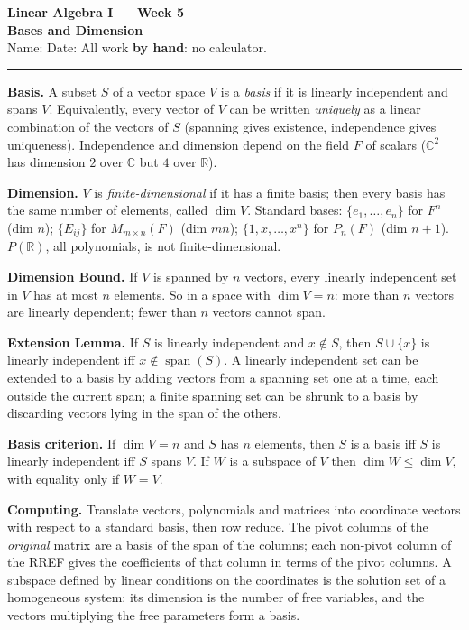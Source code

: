 \documentclass[11pt]{article}
\begin{document}
{\Large\bfseries\color{ink} Linear Algebra I --- Week 5}\\[2pt]
{\large\bfseries\color{ink} Bases and Dimension}\\[3pt]
{\small Name: \underline{\hspace{5cm}}\hfill Date: \underline{\hspace{3cm}}\qquad All work \textbf{by hand}: no calculator.}
\vspace{4pt}\hrule\vspace{8pt}

\begin{tcolorbox}[colback=soft,colframe=ink,title={\bfseries Key Facts}]
\textbf{Basis.} A subset $S$ of a vector space $V$ is a \emph{basis} if it is linearly independent and spans $V$. Equivalently, every vector of $V$ can be written \emph{uniquely} as a linear combination of the vectors of $S$ (spanning gives existence, independence gives uniqueness). Independence and dimension depend on the field $F$ of scalars ($\mathbb{C}^{2}$ has dimension $2$ over $\mathbb{C}$ but $4$ over $\mathbb{R}$).

\textbf{Dimension.} $V$ is \emph{finite-dimensional} if it has a finite basis; then every basis has the same number of elements, called $\dim V$. Standard bases: $\{e_1,\dots,e_n\}$ for $F^{n}$ (dim $n$); $\{E_{ij}\}$ for $M_{m\times n}(F)$ (dim $mn$); $\{1,x,\dots,x^{n}\}$ for $P_n(F)$ (dim $n+1$). $P(\mathbb{R})$, all polynomials, is not finite-dimensional.

\textbf{Dimension Bound.} If $V$ is spanned by $n$ vectors, every linearly independent set in $V$ has at most $n$ elements. So in a space with $\dim V=n$: more than $n$ vectors are linearly dependent; fewer than $n$ vectors cannot span.

\textbf{Extension Lemma.} If $S$ is linearly independent and $x\notin S$, then $S\cup\{x\}$ is linearly independent iff $x\notin\operatorname{span}(S)$. A linearly independent set can be extended to a basis by adding vectors from a spanning set one at a time, each outside the current span; a finite spanning set can be shrunk to a basis by discarding vectors lying in the span of the others.

\textbf{Basis criterion.} If $\dim V=n$ and $S$ has $n$ elements, then $S$ is a basis iff $S$ is linearly independent iff $S$ spans $V$. If $W$ is a subspace of $V$ then $\dim W\le\dim V$, with equality only if $W=V$.

\textbf{Computing.} Translate vectors, polynomials and matrices into coordinate vectors with respect to a standard basis, then row reduce. The pivot columns of the \emph{original} matrix are a basis of the span of the columns; each non-pivot column of the RREF gives the coefficients of that column in terms of the pivot columns. A subspace defined by linear conditions on the coordinates is the solution set of a homogeneous system: its dimension is the number of free variables, and the vectors multiplying the free parameters form a basis.
\end{tcolorbox}
\end{document}
